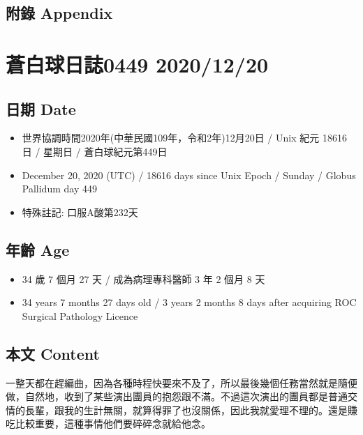 \documentclass[a5paper, 11pt
]{book}
\providecommand{\tightlist}{%
  \setlength{\itemsep}{0pt}\setlength{\parskip}{0pt}}
\begin{document}
\hypertarget{ux9644ux9304-appendix-18}{%
\subsection{附錄 Appendix}\label{ux9644ux9304-appendix-18}}

\hypertarget{ux84bcux767dux7403ux65e5ux8a8c0449-20201220}{%
\section{蒼白球日誌0449
2020/12/20}\label{ux84bcux767dux7403ux65e5ux8a8c0449-20201220}}

\hypertarget{ux65e5ux671f-date-19}{%
\subsection{日期 Date}\label{ux65e5ux671f-date-19}}

\begin{itemize}
\tightlist
\item
  世界協調時間2020年(中華民國109年，令和2年)12月20日 / Unix 紀元 18616
  日 / 星期日 / 蒼白球紀元第449日
\item
  December 20, 2020 (UTC) / 18616 days since Unix Epoch / Sunday /
  Globus Pallidum day 449
\item
  特殊註記: 口服A酸第232天
\end{itemize}

\hypertarget{ux5e74ux9f61-age-19}{%
\subsection{年齡 Age}\label{ux5e74ux9f61-age-19}}

\begin{itemize}
\tightlist
\item
  34 歲 7 個月 27 天 / 成為病理專科醫師 3 年 2 個月 8 天
\item
  34 years 7 months 27 days old / 3 years 2 months 8 days after
  acquiring ROC Surgical Pathology Licence
\end{itemize}

\hypertarget{ux672cux6587-content-19}{%
\subsection{本文 Content}\label{ux672cux6587-content-19}}

一整天都在趕編曲，因為各種時程快要來不及了，所以最後幾個任務當然就是隨便做，自然地，收到了某些演出團員的抱怨跟不滿。不過這次演出的團員都是普通交情的長輩，跟我的生計無關，就算得罪了也沒關係，因此我就愛理不理的。還是賺吃比較重要，這種事情他們要碎碎念就給他念。
\end{document}
